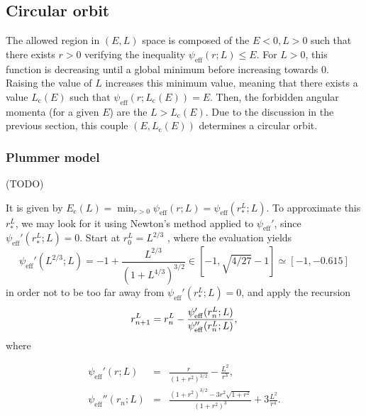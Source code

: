 \documentclass[11pt]{article}
\newcommand{\psieff}{\psi_{\mathrm{eff}}}
\newcommand{\Ec}{E_{{\mathrm{c}}}}
\newcommand{\Lc}{L_{{\mathrm{c}}}}
\begin{document}
\subsection{Circular orbit}
\label{subsec:Circular_Energy}

 The allowed region in $(E,L)$ space is composed of the
$E < 0 , L> 0$ such that there exists $r>0$ verifying the inequality
$\psieff(r;L)\leq E$. For $L>0$, this function  is decreasing until a global
minimum before increasing towards $0$. Raising the value of $L$
increases this minimum value, meaning that there exists a value $\Lc(E)$
such that $\psieff(r;\Lc(E))=E$. Then, the forbidden angular
momenta (for a given $E$) are the $L>\Lc(E)$. Due to the
discussion in the previous section, this couple $(E,\Lc(E))$
determines a circular orbit.


\subsubsection{Plummer model}
\label{subsubsec:PlummerCircularOrbit}

(TODO)

It is given by $\Ec(L)=\min_{r>0}\psieff(r;L)=\psieff(r_{*}^{L};L)$.
To approximate this $r_{*}^{L}$, we may look for it using Newton's
method applied to $\psieff'$, since $\psieff'(r_{*}^{L};L)=0$.
Start at $r_{0}^{L}=L^{2/3}$ , where the evaluation yields
\begin{equation}
\psieff'(L^{2/3};L)=-1+\frac{L^{2/3}}{(1+L^{4/3})^{3/2}}\in[-1,\sqrt{4/27}-1]\simeq[-1,-0.615]
\label{eq:start_recursion_Ec}
\end{equation}
in order not to be too far away from $\psieff'(r_{*}^{L};L)=0$,
and apply the recursion
\begin{equation}
r_{n+1}^{L}=r_{n}^{L}-\frac{\psi'_{{\rm eff}}(r_{n}^{L};L)}{\psi''_{{\rm eff}}(r_{n}^{L};L)},
\label{eq:recursion_Ec}
\end{equation}
where

\begin{equation}
\begin{array}{ccl}
 \psieff'(r;L) & =& \displaystyle{\frac{r}{(1+r^{2})^{3/2}}-\frac{L^{2}}{r^{3}}} ,\\
  
  \psieff''(r_{n};L) & =&\displaystyle{\frac{(1+r^{2})^{3/2}-3r^{2}\sqrt{1+r^{2}}}{(1+r^{2})^{3}}+3\frac{L^{2}}{r^{4}}} .
\end{array}
\label{eq:psieff_derivatives}
\end{equation}
\end{document}
